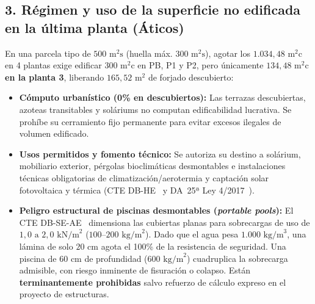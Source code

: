 \documentclass[11pt,a4paper]{article}
\begin{document}
\subsection{3. Régimen y uso de la superficie no edificada en la última planta (Áticos)}
En una parcela tipo de $500\text{ m}^2\text{s}$ (huella máx. $300\text{ m}^2\text{s}$), agotar los $1.034,48\text{ m}^2\text{c}$ en 4 plantas exige edificar $300\text{ m}^2\text{c}$ en PB, P1 y P2, pero únicamente \textbf{$134,48\text{ m}^2\text{c}$ en la planta 3}, liberando \textbf{$165,52\text{ m}^2$} de forjado descubierto:
\begin{itemize}
  \item \textbf{Cómputo urbanístico (0\% en descubiertos):} Las terrazas descubiertas, azoteas transitables y soláriums no computan edificabilidad lucrativa. Se prohíbe su cerramiento fijo permanente para evitar excesos ilegales de volumen edificado.
  \item \textbf{Usos permitidos y fomento técnico:} Se autoriza su destino a solárium, mobiliario exterior, pérgolas bioclimáticas desmontables e instalaciones técnicas obligatorias de climatización/aerotermia y captación solar fotovoltaica y térmica (CTE DB-HE~\cite{cte2006} y DA~25ª Ley 4/2017~\cite{ley4_2017_canarias}).
  \item \textbf{Peligro estructural de piscinas desmontables (\textit{portable pools}):} El CTE DB-SE-AE~\cite{cte2006} dimensiona las cubiertas planas para sobrecargas de uso de $1,0\text{ a }2,0\text{ kN/m}^2$ ($100\text{--}200\text{ kg/m}^2$). Dado que el agua pesa $1.000\text{ kg/m}^3$, una lámina de solo $20\text{ cm}$ agota el 100\% de la resistencia de seguridad. Una piscina de $60\text{ cm}$ de profundidad ($600\text{ kg/m}^2$) cuadruplica la sobrecarga admisible, con riesgo inminente de fisuración o colapso. Están \textbf{terminantemente prohibidas} salvo refuerzo de cálculo expreso en el proyecto de estructuras.
\end{itemize}
\end{document}
